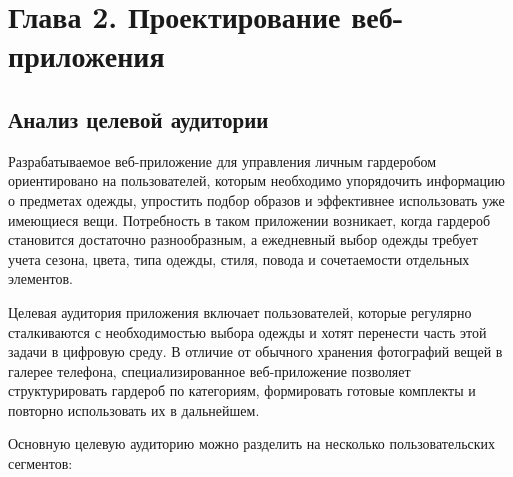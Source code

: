 \section*{Глава 2. Проектирование веб-приложения}

\subsection{Анализ целевой аудитории}

Разрабатываемое веб-приложение для управления личным гардеробом ориентировано на пользователей, которым необходимо упорядочить информацию о предметах одежды, упростить подбор образов и эффективнее использовать уже имеющиеся вещи. Потребность в таком приложении возникает, когда гардероб становится достаточно разнообразным, а ежедневный выбор одежды требует учета сезона, цвета, типа одежды, стиля, повода и сочетаемости отдельных элементов.

Целевая аудитория приложения включает пользователей, которые регулярно сталкиваются с необходимостью выбора одежды и хотят перенести часть этой задачи в цифровую среду. В отличие от обычного хранения фотографий вещей в галерее телефона, специализированное веб-приложение позволяет структурировать гардероб по категориям, формировать готовые комплекты и повторно использовать их в дальнейшем.

Основную целевую аудиторию можно разделить на несколько пользовательских сегментов:

